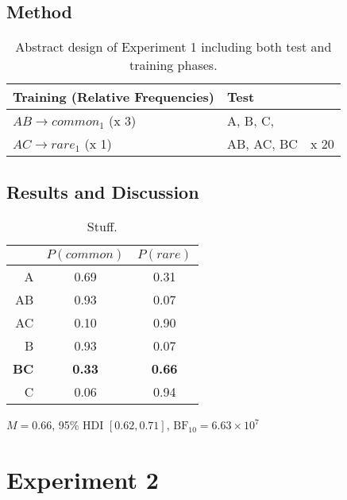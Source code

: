 \documentclass[10pt,letterpaper]{article}
\begin{document}
\subsection{Method}

\begin{table}[!ht]
  \begin{center}
    \caption{Abstract design of Experiment 1 including both test and training phases. \\}
    \label{tab:abstract-exp1}
    \begin{tabular}{llr} %
      \textbf{Training (Relative Frequencies)} & \textbf{Test}& \\
      \hline
      $AB \to common_{1}$ (x 3) &  A, B, C,         &  \\
      $AC \to rare_{1}$   (x 1) &  AB, AC, BC      & x 20 \\
      \hline
    \end{tabular}
  \end{center}
\end{table}

\subsection{Results and Discussion}

\begin{table}[H]
  \begin{center}
    \caption{Stuff. \\}
    \label{tab:results-exp1}
    \vskip 0.12in
    \begin{tabular}{rcc}
      \hline
      & $P(common)$ & $P(rare)$ \\
      \hline
      A & 0.69 & 0.31\\
      AB & 0.93 & 0.07\\
      AC & 0.10 & 0.90\\
      B & 0.93 & 0.07\\
      \textbf{BC} & \textbf{0.33} & \textbf{0.66}\\
      C & 0.06 & 0.94\\
    \end{tabular}
  \end{center}
\end{table}

$M = 0.66$, 95\% HDI $[0.62, 0.71]$, $\mathrm{BF}_{10} = 6.63 \times 10^{7}$

\section{Experiment 2}
\end{document}
